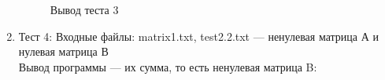 \documentclass[12pt, a4paper]{article}
\begin{document}
\begin{enumerate}
\begin{figure}[h]
  		\caption{Вывод теста 3}
	\end{figure}
	\newpage
	\item Тест 4: Входные файлы: matrix1.txt, 
	test2.2.txt --- ненулевая матрица А и нулевая матрица 
	В\\
	Вывод программы --- их сумма, то есть ненулевая матрица B:
	\begin{figure}[h]

\end{figure}
\end{enumerate}
\end{document}
